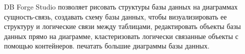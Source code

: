 \begin{figure}[ht!]
\end{figure}

\begin{figure}[ht!]
\end{figure}   


DB Forge Studio позволяет рисовать структуры базы данных на диаграммах сущность-связь,
создавать схему базы данных, чтобы визуализировать ее структуру и логические связи между таблицами,
редактировать объекты базы данных прямо на диаграмме, 
кластеризовать логически связанные объекты с помощью контейнеров. 
печатать большие диаграммы базы данных.


